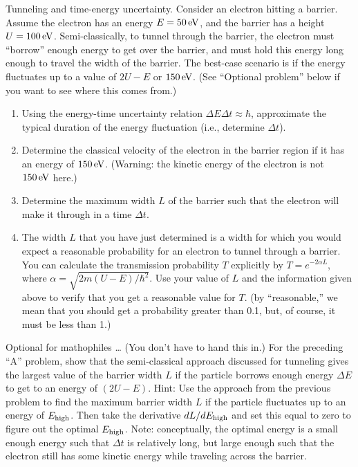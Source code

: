 \begin{aproblem}{Tunneling and time-energy uncertainty.}  
  Consider an electron hitting a barrier.  Assume the electron has an
  energy $E = 50\,\mbox{eV}$, and the barrier has a height $U =
  100\,\mbox{eV}$.  Semi-classically, to tunnel through the barrier,
  the electron must ``borrow'' enough energy to get over the barrier,
  and must hold this energy long enough to travel the width of the
  barrier.  The best-case scenario is if the energy fluctuates up to a
  value of $2U - E$ or $150\,\mbox{eV}$.  (See ``Optional problem''
  below if you want to see where this comes
  from.) \label{prob:tunneltime}

  \begin{enumerate}
  \item Using the energy-time uncertainty relation $\Delta E \Delta t
    \approx \hbar$, approximate the typical duration of the energy
    fluctuation (i.e., determine $\Delta t$).
  \item Determine the classical velocity of the electron in the
    barrier region if it has an energy of $150\,\mbox{eV}$.  (Warning:
    the kinetic energy of the electron is not $150\,\mbox{eV}$ here.)
  \item Determine the maximum width $L$ of the barrier such that the
    electron will make it through in a time $\Delta t$.
  \item The width $L$ that you have just determined is a width for
    which you would expect a reasonable probability for an electron to
    tunnel through a barrier.  You can calculate the transmission
    probability $T$ explicitly by $T = e^{-2\alpha L}$, where $\alpha
    = \sqrt{2m(U-E)/\hbar^2}$.  Use your value of $L$ and the
    information given above to verify that you get a reasonable value
    for $T$. (by ``reasonable,'' we mean that you should get a
    probability greater than 0.1, but, of course, it must be less than
    1.)
  \end{enumerate}
\end{aproblem}


\begin{aproblem}{Optional for mathophiles \dots} 
  (You don't have to hand this in.)  For the preceding ``A'' problem,
  show that the semi-classical approach discussed for tunneling gives
  the largest value of the barrier width $L$ if the particle borrows
  enough energy $\Delta E$ to get to an energy of $(2U - E)$. Hint:
  Use the approach from the previous problem to find the maximum
  barrier width $L$ if the particle fluctuates up to an energy of
  $E_{\rm high}$.  Then take the derivative $dL/dE_{\rm high}$ and set
  this equal to zero to figure out the optimal $E_{\rm high}$.  Note:
  conceptually, the optimal energy is a small enough energy such that
  $\Delta t$ is relatively long, but large enough such that the
  electron still has some kinetic energy while traveling across the
  barrier.
\end{aproblem}


